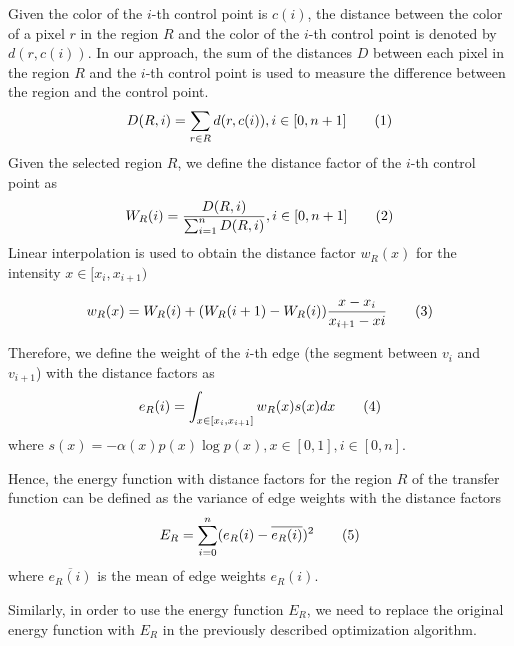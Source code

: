 Given the color of the $ i $-th control point is $ c(i) $, the distance between the color of a pixel $ r $ in the region $ R $ and the color of the $ i $-th control point is denoted by $ d(r,c(i)) $. In our approach, the sum of the distances $ D $ between each pixel in the region $ R $ and the $ i $-th control point is used to measure the difference between the region and the control point.
\[ D(R,i)=\sum_{r \in R}d(r,c(i)) , i \in [0,n+1] 
\addtag \]
Given the selected region $ R $, we define the distance factor of the $ i $-th control point as 
\[ W_{R}(i)=\frac{D(R,i)}{\sum_{i=1}^{n}D(R,i)}, i \in [0,n+1] 
\addtag \]
Linear interpolation is used to obtain the distance factor $ w_{R}(x) $ for the intensity $ x \in [x_{i},x_{i+1}) $

\[ w_{R}(x)=W_{R}(i) + (W_{R}(i+1)-W_{R}(i))\frac{x-x_{i}}{x_{i+1}-x{i}} 
\addtag \]

Therefore, we define the weight of the $ i $-th edge (the segment between $ v_{i} $ and $ v_{i+1} $) with the distance factors as
\[
e_{R}(i)=\int_{x \in [x_{i}, x_{i+1}]} w_{R}(x)s(x) dx
\addtag \]
where $ s(x)=-\alpha(x)p(x) \log p(x), x \in [0,1], i \in [0,n]$.

Hence, the energy function with distance factors for the region $ R $ of the transfer function can be defined as the variance of edge weights with the distance factors
\[
E_{R}=\sum_{i=0}^{n}(e_{R}(i)-\overline{e_{R}(i)})^{2}
\addtag \]
where $ \overline{e_{R}(i)} $ is the mean of edge weights $e_{R}(i)$.


Similarly, in order to use the energy function $ E_{R} $, we need to replace the original energy function with $ E_{R} $ in the previously described optimization algorithm.


